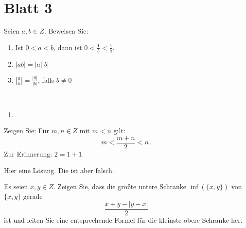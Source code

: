 \section*{Blatt 3}

\setcounter{blatt}{3}

\begin{aufg}[6 Punkte]\label{kleiner}
Seien $a,b\in Z$. Beweisen Sie: 
\begin{enumerate}[label=$\mathrm{(\roman*)}$, ref=$\mathrm{\roman*}$]
\item\label{kleineri} Ist $0<a<b$, dann ist $0<\frac1b<\frac1a$.
\item $|ab| = |a||b|$
\item $\left| \frac{a}{b} \right| = \frac{|a|}{|b|}$, falls $b\not=0$
\end{enumerate}
\end{aufg}


\bigskip

\begin{lsg}\mbox{ }
\begin{enumerate}[label=$\mathrm{(\roman*)}$, ref=$\mathrm{\roman*}$]
\item 
\end{enumerate}
\end{lsg}

\bigskip



\begin{aufg}[4 Punkte]\label{mittel}
Zeigen Sie: Für $m,n\in Z$ mit $m<n$ gilt:
\[ m<\frac{m+n}{2} < n\,.\]
Zur Erinnerung: $2 = 1+1$.
\end{aufg}
 

\bigskip

\begin{lsg}
Hier eine L\"osung. Die ist aber falsch.
\end{lsg}


\bigskip


\begin{aufg}[6 Punkte]
Es seien $x,y\in Z$. Zeigen Sie, dass die gr\"o{\ss}te untere Schranke $\inf(\{x,y\})$ von $\{x,y\}$ gerade 
\[
\frac{x+y - |y-x|}{2}
\]
ist und leiten Sie eine entsprechende Formel f\"ur die kleinste obere Schranke her.
\end{aufg}


\bigskip

\begin{lsg}
\end{lsg}


\bigskip


